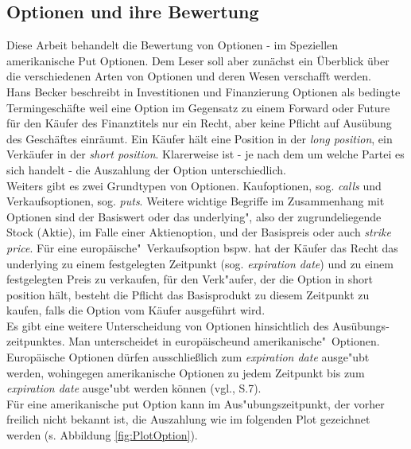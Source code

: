 \documentclass[10pt,a4paper]{article}\usepackage[]{graphicx}\usepackage[]{color}
\begin{document}
\subsection{Optionen und ihre Bewertung}
Diese Arbeit behandelt die Bewertung von Optionen - im Speziellen amerikanische Put Optionen.
Dem Leser soll aber zunächst ein Überblick über die verschiedenen Arten von Optionen und deren Wesen verschafft werden.\\
Hans Becker beschreibt in \glqq Investitionen und Finanzierung \grqq Optionen als \glqq bedingte Termingeschäfte \grqq \cite[S.313]{Becker2012} weil eine Option im Gegensatz zu einem Forward oder Future für den Käufer des Finanztitels nur ein Recht, aber keine Pflicht auf Ausübung des Geschäftes einräumt. Ein Käufer hält eine Position in der \textit{long position},  ein Verkäufer in der \textit{short position}. Klarerweise ist - je nach dem um welche Partei es sich handelt -  die Auszahlung der Option unterschiedlich.\\
Weiters gibt es zwei Grundtypen von Optionen. Kaufoptionen, sog. \textit{calls} und Verkaufsoptionen, sog. \textit{puts}. Weitere wichtige Begriffe im Zusammenhang mit Optionen sind der Basiswert oder das \glqq underlying", also der zugrundeliegende Stock (Aktie), im Falle einer Aktienoption, und der Basispreis oder auch \textit{strike price}. Für eine \glqq europäische"\ Verkaufsoption bspw. hat der Käufer das Recht das underlying zu 
einem festgelegten Zeitpunkt (sog. \textit{expiration date}) und zu einem festgelegten Preis zu verkaufen, für den Verk"aufer, der die Option in short position hält, besteht die Pflicht das Basisprodukt zu diesem Zeitpunkt zu kaufen, falls die Option vom Käufer ausgeführt wird.\\
Es gibt eine weitere Unterscheidung von Optionen hinsichtlich des Ausübungs-zeitpunktes. Man unterscheidet in \glqq europäische\grqq und \glqq amerikanische"\ Optionen. Europäische Optionen dürfen ausschließlich zum \textit{expiration date} ausge"ubt werden, wohingegen amerikanische Optionen zu jedem Zeitpunkt bis zum \textit{expiration date}  ausge"ubt werden können (vgl.\cite{Hull}, S.7).\\
Für eine amerikanische put Option kann im Aus"ubungszeitpunkt, der vorher freilich nicht bekannt ist, die Auszahlung wie im folgenden Plot gezeichnet werden (s. Abbildung \ref{fig:PlotOption}).
\end{document}

